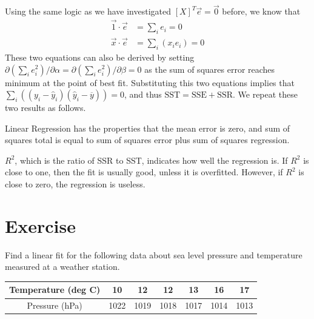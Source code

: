 Using the same logic as we have investigated $[X]^T\vec{e} = \vec{0}$ before, we know that
\begin{align*}
\vec{1} \cdot \vec{e} &= \sum_i e_i = 0 \\
\vec{x} \cdot \vec{e} &= \sum_i (x_i e_i) = 0
\end{align*}
These two equations can also be derived by setting $\partial (\sum_i e_i^2)/\partial \alpha = \partial (\sum_i e_i^2)/\partial \beta = 0$ as the sum of squares error reaches minimum at the point of best fit. Substituting this two equations implies that $\sum_i ((y_i - \hat{y}_i) (\hat{y}_i - \overline{y})) = 0$, and thus $\text{SST} = \text{SSE} + \text{SSR}$. We repeat these two results as follows.
\begin{proper}
Linear Regression has the properties that the mean error is zero, and sum of squares total is equal to sum of squares error plus sum of squares regression.
\end{proper}
$R^2$, which is the ratio of SSR to SST, indicates how well the regression is. If $R^2$ is close to one, then the fit is usually good, unless it is overfitted. However, if $R^2$ is close to zero, the regression is useless.


\section{Exercise}

\begin{Exercise}
Find a linear fit for the following data about sea level pressure and temperature measured at a weather station.
\begin{center}
\begin{tabular}{|c|c|c|c|c|c|c|}
\hline
Temperature (deg C) & 10 & 12 & 12 & 13 & 16 & 17\\
\hline
Pressure (hPa) & 1022 & 1019 & 1018 & 1017 & 1014 & 1013\\
\hline
\end{tabular}
\end{center}
\end{Exercise}

